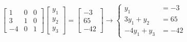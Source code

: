 	\[ \begin{bmatrix} 1 & 0 & 0 \\ 3 & 1 & 0 \\ -4 & 0 & 1 \end{bmatrix} \begin{bmatrix} y_1 \\ y_2 \\ y_3 \end{bmatrix} = \begin{bmatrix} -3 \\ 65 \\ -42 \end{bmatrix} \to \begin{cases} y_1 & = -3 \\ 3y_1 +y_2 & = 65 \\ -4y_1 + y_3 & = -42 \end{cases} \]

